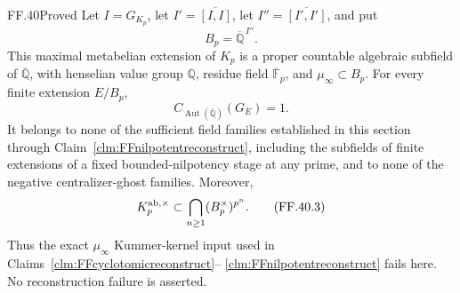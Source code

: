 \begin{claim}{FF.40}{Proved}\label{clm:FFmetabeliantest}
Let \(I=G_{K_p}\), let \(I'=\overline{[I,I]}\),
let \(I''=\overline{[I',I']}\), and put
\[
                  B_p=\overline{\mathbb Q}^{\,I''}.
                                                        \tag{FF.40.1}
\]
This maximal metabelian extension of \(K_p\)
is a proper countable algebraic subfield of
\(\overline{\mathbb Q}\), with henselian
value group \(\mathbb Q\), residue field
\(\overline{\mathbb F}_p\), and
\(\mu_\infty\subset B_p\).
For every finite extension \(E/B_p\),
\[
             C_{\operatorname{Aut}(\overline{\mathbb Q})}(G_E)=1.
                                                        \tag{FF.40.2}
\]
It belongs to none of the sufficient field
families established in this section through
Claim~\ref{clm:FFnilpotentreconstruct}, including
the subfields of finite extensions of a
fixed bounded-nilpotency stage at any prime,
and to none of the negative centralizer-ghost
families. Moreover,
\[
 K_p^{{\rm ab},\times}\subset
                  \bigcap_{n\ge1}(B_p^\times)^{p^n}.
                                                        \tag{FF.40.3}
\]
Thus the exact \(\mu_\infty\) Kummer-kernel
input used in Claims~\ref{clm:FFcyclotomicreconstruct}--
\ref{clm:FFnilpotentreconstruct} fails here.
No reconstruction failure is asserted.
\end{claim}
